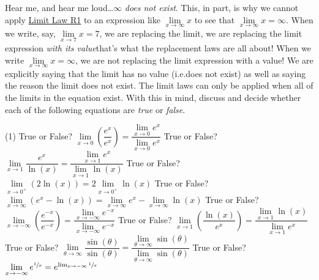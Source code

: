 \documentclass[12pt,]{book}
\theoremstyle{plain}
\theoremstyle{definition}
\theoremstyle{definition}
\theoremstyle{definition}
\theoremstyle{definition}
\theoremstyle{definition}
\numberwithin{equation}{section}
\newcommand{\fe}[2]{#1\mathopen{}\left(#2\right)\mathclose{}}
\begin{document}
\begin{exerciselist}
{\begin{figure}
\end{figure}
}%
\par\smallskip
\hypertarget{exercisegroup-hear-me}{}\par\noindent Hear me, and hear me loud\dots{}\(\infty\) \emph{does not exist}. This, in part, is why we cannot apply \hyperref[llr1]{Limit Law R1} to an expression like \(\lim\limits_{x\to\infty}x\) to see that \(\lim\limits_{x\to\infty}x=\infty\). When we write, say, \(\lim\limits_{x\to7}x=7\), we are replacing the limit, we are replacing the limit expression \emph{with its value}\textemdash{}that's what the replacement laws are all about! When we write \(\lim\limits_{x\to\infty}x=\infty\), we are not replacing the limit expression with a value! We are explicitly saying that the limit has no value (i.e.\@ does not exist) as well as saying the reason the limit does not exist. The limit laws can only be applied when all of the limits in the equation exist. With this in mind, discuss and decide whether each of the following equations are \emph{true} or \emph{false}.%
\begin{exercisegroup}(1)
\exercise[11.]\hypertarget{exercise-hear-me-first}{}True or False? \(\lim\limits_{x\to0}\left(\dfrac{e^x}{e^x}\right)=\dfrac{\lim\limits_{x\to0}e^x}{\lim\limits_{x\to0}e^x}\)%
\exercise[12.]\hypertarget{exercise-101}{}True or False? \(\lim\limits_{x\to1}\dfrac{e^x}{\fe{\ln}{x}}=\dfrac{\lim\limits_{x\to1}e^x}{\lim\limits_{x\to1}\fe{\ln}{x}}\)%
\exercise[13.]\hypertarget{exercise-102}{}True or False? \(\lim\limits_{x\to0^{+}}\left(2\fe{\ln}{x}\right)=2\lim\limits_{x\to0^{+}}\fe{\ln}{x}\)%
\exercise[14.]\hypertarget{exercise-103}{}True or False? \(\lim\limits_{x\to\infty}\left(e^x-\fe{\ln}{x}\right)=\lim\limits_{x\to\infty}e^x-\lim\limits_{x\to\infty}\fe{\ln}{x}\)%
\exercise[15.]\hypertarget{exercise-104}{}True or False? \(\lim\limits_{x\to-\infty}\left(\dfrac{e^{-x}}{e^{-x}}\right)=\dfrac{\lim\limits_{x\to-\infty}e^{-x}}{\lim\limits_{x\to-\infty}e^{-x}}\)%
\exercise[16.]\hypertarget{exercise-105}{}True or False? \(\lim\limits_{x\to1}\left(\dfrac{\fe{\ln}{x}}{e^x}\right)=\dfrac{\lim\limits_{x\to1}\fe{\ln}{x}}{\lim\limits_{x\to1}e^x}\)%
\exercise[17.]\hypertarget{exercise-106}{}True or False? \(\lim\limits_{\theta\to\infty}\dfrac{\fe{\sin}{\theta}}{\fe{\sin}{\theta}}=\dfrac{\lim\limits_{\theta\to\infty}\fe{\sin}{\theta}}{\lim\limits_{\theta\to\infty}\fe{\sin}{\theta}}\)%
\exercise[18.]\hypertarget{exercise-hear-me-last}{}True or False? \(\lim\limits_{x\to-\infty}e^{\sfrac{1}{x}}=e^{\lim_{x\to-\infty}\sfrac{1}{x}}\)%

\end{exercisegroup}
\end{exerciselist}
\end{document}
